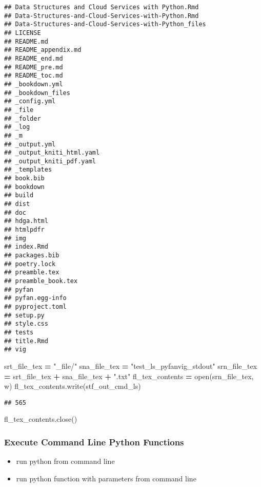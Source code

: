 \documentclass[
]{book}
\newenvironment{Shaded}{\begin{snugshade}}{\end{snugshade}}
\newcommand{\BuiltInTok}[1]{#1}
\newcommand{\NormalTok}[1]{#1}
\newcommand{\OperatorTok}[1]{\textcolor[rgb]{0.81,0.36,0.00}{\textbf{#1}}}
\newcommand{\StringTok}[1]{\textcolor[rgb]{0.31,0.60,0.02}{#1}}
\providecommand{\tightlist}{%
  \setlength{\itemsep}{0pt}\setlength{\parskip}{0pt}}
\begin{document}
\begin{verbatim}
## Data Structures and Cloud Services with Python.Rmd
## Data-Structures-and-Cloud-Services-with-Python.Rmd
## Data-Structures-and-Cloud-Services-with-Python_files
## LICENSE
## README.md
## README_appendix.md
## README_end.md
## README_pre.md
## README_toc.md
## _bookdown.yml
## _bookdown_files
## _config.yml
## _file
## _folder
## _log
## _m
## _output.yml
## _output_kniti_html.yaml
## _output_kniti_pdf.yaml
## _templates
## book.bib
## bookdown
## build
## dist
## doc
## hdga.html
## htmlpdfr
## img
## index.Rmd
## packages.bib
## poetry.lock
## preamble.tex
## preamble_book.tex
## pyfan
## pyfan.egg-info
## pyproject.toml
## setup.py
## style.css
## tests
## title.Rmd
## vig
\end{verbatim}

\begin{Shaded}
\begin{Highlighting}[]
\NormalTok{srt\_file\_tex }\OperatorTok{=} \StringTok{"\_file/"}
\NormalTok{sna\_file\_tex }\OperatorTok{=} \StringTok{"test\_ls\_pyfanvig\_stdout"}
\NormalTok{srn\_file\_tex }\OperatorTok{=}\NormalTok{ srt\_file\_tex }\OperatorTok{+}\NormalTok{ sna\_file\_tex }\OperatorTok{+} \StringTok{".txt"}
\NormalTok{fl\_tex\_contents }\OperatorTok{=} \BuiltInTok{open}\NormalTok{(srn\_file\_tex, }\StringTok{\textquotesingle{}w\textquotesingle{}}\NormalTok{)}
\NormalTok{fl\_tex\_contents.write(stf\_out\_cmd\_ls)}
\end{Highlighting}
\end{Shaded}

\begin{verbatim}
## 565
\end{verbatim}

\begin{Shaded}
\begin{Highlighting}[]
\NormalTok{fl\_tex\_contents.close()}
\end{Highlighting}
\end{Shaded}

\hypertarget{execute-command-line-python-functions}{%
\subsubsection{Execute Command Line Python Functions}\label{execute-command-line-python-functions}}

\begin{itemize}
\tightlist
\item
  run python from command line
\item
  run python function with parameters from command line
\end{itemize}
\end{document}
